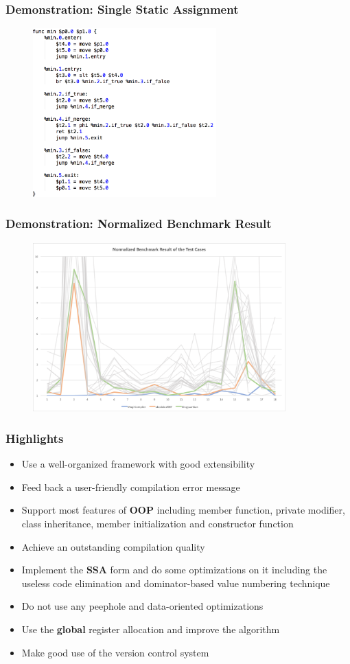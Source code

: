 \documentclass{beamer}
\begin{document}
	\begin{frame}
		\frametitle{Demonstration: Single Static Assignment}
		\begin{figure}[!htp]
			\includegraphics[height=6.5cm]{image/single-static-assignment/after-single-static-assignment}
		\end{figure}
	\end{frame}

	\begin{frame}
		\frametitle{Demonstration: Normalized Benchmark Result}
		\begin{figure}[!htp]
			\includegraphics[height=6.5cm]{image/benchmark/single-static-assignment}
		\end{figure}
	\end{frame}

	\begin{frame}
		\frametitle{Highlights}
		\begin{itemize}
			\item Use a well-organized framework with good extensibility
			\item Feed back a user-friendly compilation error message
			\item Support most features of \textbf{OOP} including member function, private modifier, class inheritance, member initialization and constructor function
			\item Achieve an outstanding compilation quality
			\item Implement the \textbf{SSA} form and do some optimizations on it including the useless code elimination and dominator-based value numbering technique
			\item Do not use any peephole and data-oriented optimizations
			\item<0-0> Use the \textbf{global} register allocation and improve the algorithm
			\item<0-0> Make good use of the version control system
		\end{itemize}
	\end{frame}
\end{document}
